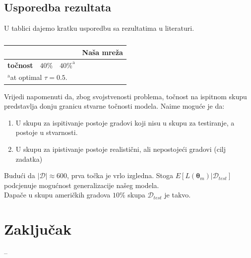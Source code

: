 \documentclass[conference]{IEEEtran}
\begin{document}
\subsection{Usporedba rezultata}
U tablici dajemo kratku usporedbu sa rezultatima u literaturi.
\begin{table}[htbp]
\caption{ }
\begin{center}
\begin{tabular}{|c|c|c|c|}
\hline
 & \textbf{\cite{randolph}} & \textbf{\cite{name_generator}} & \textbf{Naša mreža}  \\ \hline
\textbf{točnost} & $40\%$ & $40\%^{\mathrm{a}}$ &  \\ \hline
\multicolumn{4}{l}{$^{\mathrm{a}}$at optimal $\tau=0.5$.}
\end{tabular}
\label{tab:result}
\end{center}
\end{table}

Vrijedi napomenuti da, zbog svojstvenosti problema, točnost na ispitnom skupu predstavlja donju granicu stvarne točnosti modela. Naime moguće je da:
\begin{enumerate}
\item U skupu za ispitivanje postoje gradovi koji nisu u skupu za testiranje, a postoje u stvarnosti.
\item U skupu za ipistivanje postoje realistični, ali nepostojeći gradovi (cilj zadatka)
\end{enumerate}
Budući da $\lvert \mathcal{D} \rvert \approx 600$, prva točka je vrlo izgledna. Stoga $E[L(\mathbf{\boldsymbol{\theta}}_m) | \mathcal{D}_{test}]$ podcjenuje mogućnost generalizacije našeg modela.\\
Dapače u skupu američkih gradova $10\%$ skupa $\mathcal{D}_{test}$ je takvo.

\section{Zaključak}
--
\end{document}
